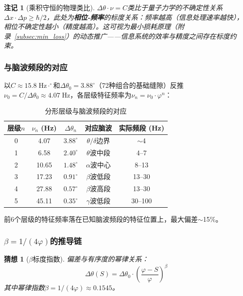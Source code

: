 \documentclass[12pt,a4paper,twocolumn]{article}
\renewcommand{\phi}{\varphi}
\newtheorem{remark}[theorem]{注记}
\newtheorem{conjecture}[theorem]{猜想}
\begin{document}
\begin{remark}[乘积守恒的物理类比]
$\Delta\theta \cdot \nu = C$类比于量子力学的不确定性关系$\Delta x \cdot \Delta p \geq \hbar/2$，此处为\textbf{相位-频率}的标度关系：频率越高（信息处理速率越快），相位不确定性越小（精度越高）。这可视为最小损耗原理（附录~\ref{subsec:min_loss}）的动态推广——信息系统的效率与精度之间存在标度约束。
\end{remark}

\subsubsection{与脑波频段的对应}

以$C \approx 15.8\;\text{Hz}\cdot^\circ$和$\Delta\theta_0 = 3.88^\circ$（72种组合的基础缝隙）反推$\nu_0 = C/\Delta\theta_0 \approx 4.07\;\text{Hz}$，各层级特征频率为$\nu_n = \nu_0 \cdot \phi^n$：

\begin{table}[htbp]
\centering
\caption{分形层级与脑波频段的对应}
\label{tab:brain_waves}
\begin{tabular}{ccccc}
\hline
层级$n$ & $\nu_n$ (Hz) & $\Delta\theta_n$ & 对应脑波 & 实际频段 (Hz) \\
\hline
0 & 4.07 & $3.88^\circ$ & $\theta/\delta$边界 & $\sim$4 \\
1 & 6.58 & $2.40^\circ$ & $\theta$波中段 & 4--7 \\
2 & 10.65 & $1.48^\circ$ & $\alpha$波中心 & 8--13 \\
3 & 17.23 & $0.91^\circ$ & $\beta$波低段 & 13--30 \\
4 & 27.88 & $0.57^\circ$ & $\beta$波高段 & 13--30 \\
5 & 45.11 & $0.35^\circ$ & $\gamma$波低段 & 30--100 \\
\hline
\end{tabular}
\end{table}

前6个层级的特征频率落在已知脑波频段的特征位置上，最大偏差$\sim$15\%。

\subsubsection{$\beta = 1/(4\phi)$的推导链}

\begin{conjecture}[$\beta$标度指数]
\label{conj:beta}
偏差与有序度的幂律关系：
\begin{equation}
\Delta\theta(S) = \Delta\theta_0 \cdot \left(\frac{\phi - S}{\phi}\right)^{\beta}
\label{eq:beta_scaling}
\end{equation}
其中幂律指数$\beta = 1/(4\phi) \approx 0.1545$。
\end{conjecture}
\end{document}
